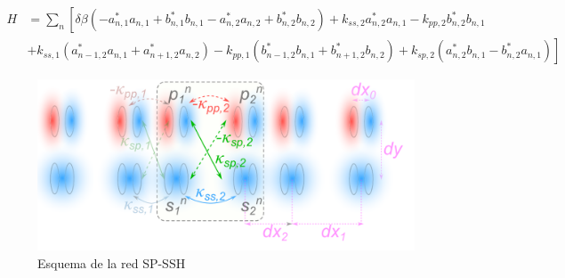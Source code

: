 \begin{align*}
	H &= \sum_n \left[\delta\beta \left(- a^*_{n, 1} a_{n, 1} + b^*_{n, 1} b_{n, 1}  - a^*_{n, 2} a_{n, 2} + b^*_{n, 2} b_{n, 2}\right) +k_{ss, 2}a^*_{n, 2} a_{n, 1} -k_{pp, 2}b^*_{n, 2} b_{n, 1} \right. 
	\\	
	&\left. + k_{ss, 1} \left( a_{n-1, 2}^*a_{n, 1} + a_{n+1, 2}^*a_{n, 2} \right) - k_{pp, 1} \left( b_{n-1, 2}^*b_{n, 1} + b_{n+1, 2}^*b_{n, 2} \right) +k_{sp, 2} \left( a_{n, 2}^* b_{n, 1} - b_{n, 2}^* a_{n, 1} \right) \right]
\end{align*}

\begin{figure}[H]
\centering
	\includegraphics[width=0.7\linewidth]{media/ssh_sp_model}
	\caption{Esquema de la red SP-SSH}
\end{figure}
